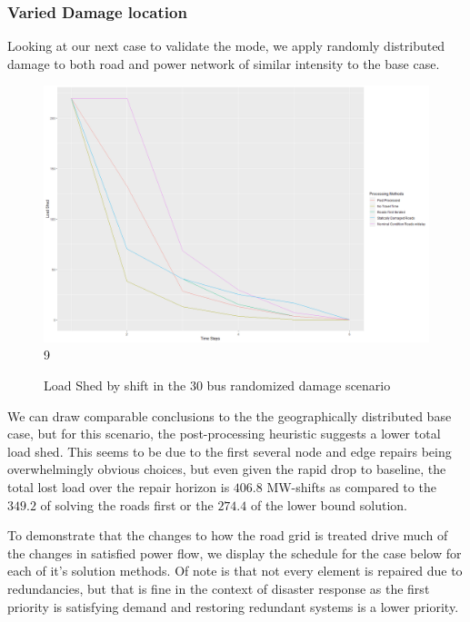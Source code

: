 \documentclass{article}
\begin{document}
	\subsubsection{Varied Damage location}
	Looking at our next case to validate the mode, we apply randomly distributed damage to both road and power network of similar intensity to the base case.
		\begin{figure}[H]
		\centering
		
		\centering
		\includegraphics[width=.9\linewidth]{Rplot30Rand.png}9
		\caption{Load Shed by shift in the 30 bus randomized damage scenario}
		\label{fig:sub1}
	\end{figure}

	We can draw comparable conclusions to the the geographically distributed base case, but for this scenario, the post-processing heuristic suggests a lower total load shed. This seems to be due to the first several node and edge repairs being overwhelmingly obvious choices, but even given the rapid drop to baseline, the total lost load over the repair horizon is $406.8$ MW-shifts as compared to the $349.2$ of solving the roads first or the $274.4$ of the lower bound solution.
	
	To demonstrate that the changes to how the road grid is treated drive much of the changes in satisfied power flow, we display the schedule for the case below for each of it's solution methods. Of note is that not every element is repaired due to redundancies, but that is fine in the context of disaster response as the first priority is satisfying demand and restoring redundant systems is a lower priority. 
	
\end{document}
